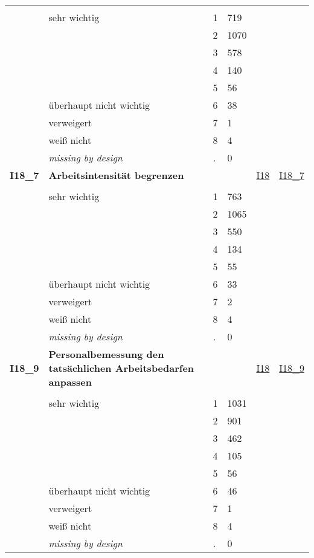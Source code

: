 \begin{longtable}{| L{2.45cm} | L{6cm} | C{1.5cm} | R{1cm} | C{2.25cm} | C{2.25cm} |}
   &  &  &  &  &  \\ 
   & sehr wichtig & 1 & 719 &  &  \\ 
   &  & 2 & 1070 &  &  \\ 
   &  & 3 & 578 &  &  \\ 
   &  & 4 & 140 &  &  \\ 
   &  & 5 & 56 &  &  \\ 
   & überhaupt nicht wichtig & 6 & 38 &  &  \\ 
   & verweigert & 7 & 1 &  &  \\ 
   & weiß nicht & 8 & 4 &  &  \\ 
   & \textit{missing by design} & \textit{.} & 0 &  &  \\ 
   \midrule
\textbf{I18\_7}\label{var:I18:7} & \textbf{Arbeitsintensität begrenzen} &  &  & \hyperref[I18]{I18} & \hyperref[var:suf:I18:7]{I18\_7} \\ 
   &  &  &  &  &  \\ 
   & sehr wichtig & 1 & 763 &  &  \\ 
   &  & 2 & 1065 &  &  \\ 
   &  & 3 & 550 &  &  \\ 
   &  & 4 & 134 &  &  \\ 
   &  & 5 & 55 &  &  \\ 
   & überhaupt nicht wichtig & 6 & 33 &  &  \\ 
   & verweigert & 7 & 2 &  &  \\ 
   & weiß nicht & 8 & 4 &  &  \\ 
   & \textit{missing by design} & \textit{.} & 0 &  &  \\ 
   \midrule
\textbf{I18\_9}\label{var:I18:9} & \textbf{Personalbemessung den tatsächlichen Arbeitsbedarfen anpassen} &  &  & \hyperref[I18]{I18} & \hyperref[var:suf:I18:9]{I18\_9} \\ 
   &  &  &  &  &  \\ 
   & sehr wichtig & 1 & 1031 &  &  \\ 
   &  & 2 & 901 &  &  \\ 
   &  & 3 & 462 &  &  \\ 
   &  & 4 & 105 &  &  \\ 
   &  & 5 & 56 &  &  \\ 
   & überhaupt nicht wichtig & 6 & 46 &  &  \\ 
   & verweigert & 7 & 1 &  &  \\ 
   & weiß nicht & 8 & 4 &  &  \\ 
   & \textit{missing by design} & \textit{.} & 0 &  &  \\ 

\end{longtable}
